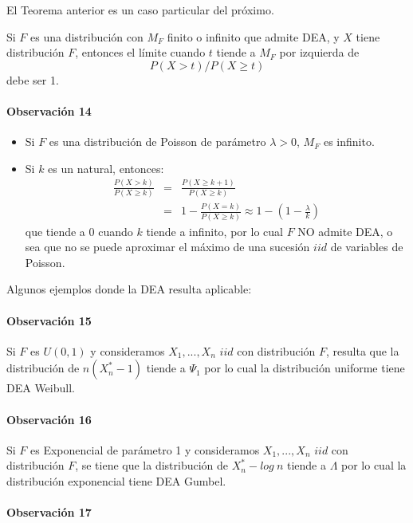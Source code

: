 \documentclass[
  12pt]{article}
\begin{document}
El Teorema anterior es un caso particular del próximo.

\begin{theorem}
Si $F$ es una distribución con $M_F$ finito o infinito que admite DEA, y $X$ tiene distribución $F$, entonces el límite cuando $t$ tiende a $M_F$ por izquierda de
$$P(X>t)/P(X \geq t)$$
debe ser 1.
\end{theorem}

\paragraph*{Observación 14}
\begin{itemize}
\item Si $F$ es una distribución de Poisson de parámetro $\lambda>0$, $M_F$ es infinito. 
\item Si $k$ es un natural, entonces:
\begin{eqnarray}
\frac{P(X>k)}{P(X\geq k)} &=& \frac{P(X \geq k+1)}{P(X\geq k)} \\ \nonumber
&=& 1-\frac{P(X=k)}{P(X \geq k)} \approx 1-\left(1- \frac{\lambda}{k}\right) 
\end{eqnarray}
que tiende a $0$ cuando $k$ tiende a infinito, por lo cual $F$ NO admite DEA, o sea que no se puede aproximar el máximo de una sucesión $iid$ de variables de Poisson.
\end{itemize}

Algunos ejemplos donde la DEA resulta aplicable:

\paragraph*{Observación 15}

Si \(F\) es \(U(0,1)\) y consideramos \(X_1,...,X_n\) \(iid\) con
distribución \(F\), resulta que la distribución de \(n( X_n^*- 1)\)
tiende a \(\Psi_1\) por lo cual la distribución uniforme tiene DEA
Weibull.

\paragraph*{Observación 16}

Si \(F\) es Exponencial de parámetro 1 y consideramos \(X_1,...,X_n\)
\(iid\) con distribución \(F\), se tiene que la distribución de
\(X_n^*- log\: n\) tiende a \(\Lambda\) por lo cual la distribución
exponencial tiene DEA Gumbel.

\paragraph*{Observación 17}
\end{document}
